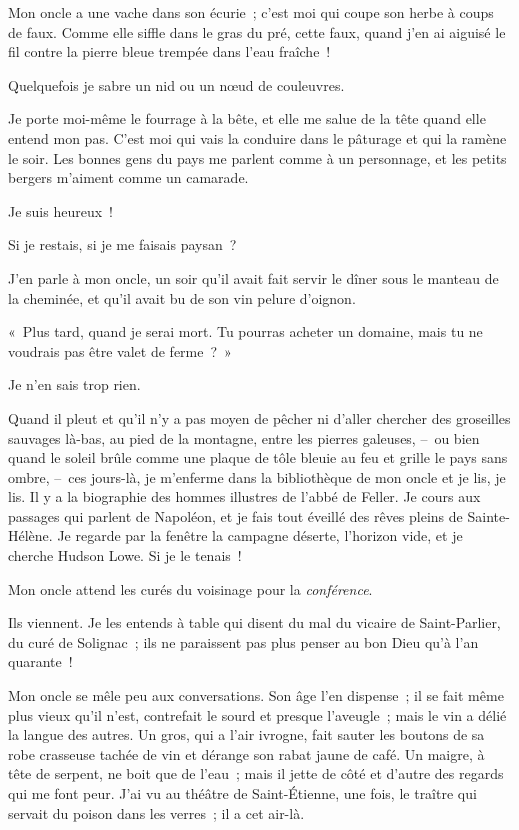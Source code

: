 \documentclass[french,twoside]{book} %
\begin{document}
\bigbreak
\noindent Mon oncle a une vache dans son écurie ; c’est moi qui coupe son herbe à coups de faux. Comme elle siffle dans le gras du pré, cette faux, quand j’en ai aiguisé le fil contre la pierre bleue trempée dans l’eau fraîche !\par
Quelquefois je sabre un nid ou un nœud de couleuvres.\par
Je porte moi-même le fourrage à la bête, et elle me salue de la tête quand elle entend mon pas. C’est moi qui vais la conduire dans le pâturage et qui la ramène le soir. Les bonnes gens du pays me parlent comme à un personnage, et les petits bergers m’aiment comme un camarade.\par
Je suis heureux !\par
Si je restais, si je me faisais paysan ?\par
J’en parle à mon oncle, un soir qu’il avait fait servir le dîner sous le manteau de la cheminée, et qu’il avait bu de son vin pelure d’oignon.\par
« Plus tard, quand je serai mort. Tu pourras acheter un domaine, mais tu ne voudrais pas être valet de ferme ? »\par
Je n’en sais trop rien.\par
\bigbreak
\noindent Quand il pleut et qu’il n’y a pas moyen de pêcher ni d’aller chercher des groseilles sauvages là-bas, au pied de la montagne, entre les pierres galeuses, – ou bien quand le soleil brûle comme une plaque de tôle bleuie au feu et grille le pays sans ombre, – ces jours-là, je m’enferme dans la bibliothèque de mon oncle et je lis, je lis. Il y a la biographie des hommes illustres de l’abbé de Feller. Je cours aux passages qui parlent de Napoléon, et je fais tout éveillé des rêves pleins de Sainte-Hélène. Je regarde par la fenêtre la campagne déserte, l’horizon vide, et je cherche Hudson Lowe. Si je le tenais !\par
\bigbreak
\noindent Mon oncle attend les curés du voisinage pour la \emph{conférence}.\par
Ils viennent. Je les entends à table qui disent du mal du vicaire de Saint-Parlier, du curé de Solignac ; ils ne paraissent pas plus penser au bon Dieu qu’à l’an quarante !\par
Mon oncle se mêle peu aux conversations. Son âge l’en dispense ; il se fait même plus vieux qu’il n’est, contrefait le sourd et presque l’aveugle ; mais le vin a délié la langue des autres. Un gros, qui a l’air ivrogne, fait sauter les boutons de sa robe crasseuse tachée de vin et dérange son rabat jaune de café. Un maigre, à tête de serpent, ne boit que de l’eau ; mais il jette de côté et d’autre des regards qui me font peur. J’ai vu au théâtre de Saint-Étienne, une fois, le traître qui servait du poison dans les verres ; il a cet air-là.\par
\end{document}
